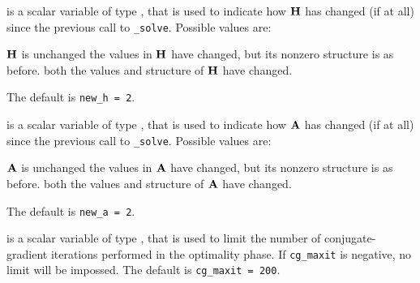 \begin{description}





 is a scalar variable of type \integer, that is used
to indicate how ${\mathbf{H}}$ has changed (if at all) since the previous call
to {\tt \packagename\_solve}. Possible values are:
\begin{description}
 ${\mathbf{H}}$ is unchanged
 the values in ${\mathbf{H}}$ have changed, but its nonzero structure 
is as before.
 both the values and structure of ${\mathbf{H}}$ have changed.
\end{description}
The default is {\tt new\_h = 2}.

 is a scalar variable of type \integer, that is used
to indicate how ${\mathbf{A}}$ has changed (if at all) since the previous call
to {\tt \packagename\_solve}. Possible values are:
\begin{description}
 ${\mathbf{A}}$ is unchanged
 the values in ${\mathbf{A}}$ have changed, but its nonzero structure 
is as before.
 both the values and structure of ${\mathbf{A}}$ have changed.
\end{description}
The default is {\tt new\_a = 2}.

 is a scalar variable of type \integer, that is used
to limit the number of conjugate-gradient iterations performed in 
the optimality phase. If 
{\tt cg\_maxit} is negative, no limit will be impossed. The default
is {\tt cg\_maxit = 200}.


\end{description}

